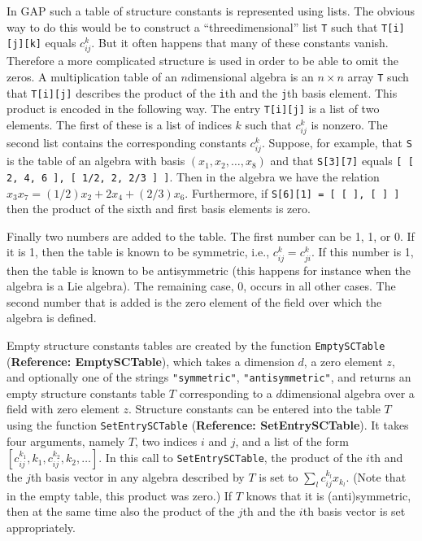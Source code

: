 \documentclass[a4paper,11pt]{report}
\begin{document}
{{ In \textsf{GAP} such a table of structure constants is represented using lists. The obvious
way to do this would be to construct a ``three\texttt{}dimensional'' list \texttt{T} such that \texttt{T[i][j][k]} equals $c_{ij}^k$. But it often happens that many of these constants vanish. Therefore a more
complicated structure is used in order to be able to omit the zeros. A
multiplication table of an $n$\texttt{}dimensional algebra is an $n \times n$ array \texttt{T} such that \texttt{T[i][j]} describes the product of the \texttt{i}\texttt{}th and the \texttt{j}\texttt{}th basis element. This product is encoded in the following
way. The entry \texttt{T[i][j]} is a list of two elements. The first of these is a list of indices $k$ such that $c_{ij}^k$ is nonzero. The second list contains the corresponding constants $c_{ij}^k$. Suppose, for example, that \texttt{S} is the table of an algebra with basis $(x_1, x_2, \ldots, x_8)$ and that \texttt{S[3][7]} equals \texttt{[ [ 2, 4, 6 ], [ 1/2, 2, 2/3 ] ]}. Then in the algebra we have the relation $x_3 x_7 = (1/2) x_2 + 2 x_4 + (2/3) x_6.$ Furthermore, if \texttt{S[6][1] = [ [ ], [ ] ]} then the product of the sixth and first basis elements is zero. 

 Finally two numbers are added to the table. The first number can be 1,
\texttt{}1, or 0. If it is 1, then the table is known to be
symmetric, i.e., $c_{ij}^k = c_{ji}^k$. If this number is \texttt{}1, then the table is known to be
antisymmetric (this happens for instance when the algebra is a Lie algebra).
The remaining case, 0, occurs in all other cases. The second number that is
added is the zero element of the field over which the algebra is defined. 

 Empty structure constants tables are created by the function \texttt{EmptySCTable} (\textbf{Reference: EmptySCTable}), which takes a dimension $d$, a zero element $z$, and optionally one of the strings \texttt{"symmetric"}, \texttt{"antisymmetric"}, and returns an empty structure constants table $T$ corresponding to a $d$\texttt{}dimensional algebra over a field with zero element $z$. Structure constants can be entered into the table $T$ using the function \texttt{SetEntrySCTable} (\textbf{Reference: SetEntrySCTable}). It takes four arguments, namely $T$, two indices $i$ and $j$, and a list of the form $[ c_{ij}^{{k_1}}, k_1, c_{ij}^{{k_2}}, k_2, \ldots ]$. In this call to \texttt{SetEntrySCTable}, the product of the $i$\texttt{}th and the $j$\texttt{}th basis vector in any algebra described by $T$ is set to $\sum_l c_{ij}^{{k_l}} x_{{k_l}}$. (Note that in the empty table, this product was zero.) If $T$ knows that it is (anti)symmetric, then at the same time also the product of
the $j$\texttt{}th and the $i$\texttt{}th basis vector is set appropriately. 

}}
\end{document}

